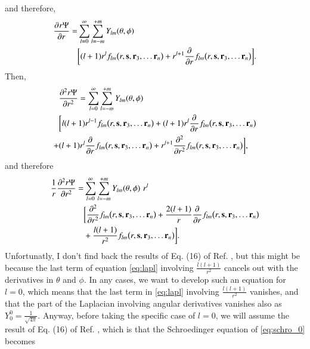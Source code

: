\documentclass[aip,jcp,reprint,noshowkeys,superscriptaddress]{revtex4-1}
\newcommand{\deriv}[3]{\frac{\partial^{#3} #1}{\partial {#2}^{#3}}}
\newcommand{\bd}[1]{{\bf {#1}}}
\newcommand{\bs}[0]{{\bf {s}}}
\begin{document}
and therefore, 
\begin{equation}
 \begin{aligned}
 \deriv{r\Psi}{r}{}  = & \sum_{l=0}^{\infty} \sum_{l=-m}^{+m}  Y_{lm}(\theta,\phi)\\  
  & \bigg[ (l+1) r^l f_{lm}\big(r,\bs,\bd{r}_3, \hdots \bd{r}_n\big) + r^{l+1} \deriv{}{r}{} f_{lm}\big(r,\bs,\bd{r}_3, \hdots \bd{r}_n\big)\bigg]. 
 \end{aligned}
\end{equation}
Then, 
\begin{equation}
 \begin{aligned}
 &\deriv{r\Psi}{r}{2}  = \sum_{l=0}^{\infty} \sum_{l=-m}^{+m}  Y_{lm}(\theta,\phi)\\   
 & \bigg[ l(l+1) r^{l-1} f_{lm}\big(r,\bs,\bd{r}_3, \hdots \bd{r}_n\big) + (l+1) r^l \deriv{}{r}{} f_{lm}\big(r,\bs,\bd{r}_3, \hdots \bd{r}_n\big) \\
+& (l+1) r^l  \deriv{}{r}{} f_{lm}\big(r,\bs,\bd{r}_3, \hdots \bd{r}_n\big) + r^{l+1} \deriv{}{r}{2} f_{lm}\big(r,\bs,\bd{r}_3, \hdots \bd{r}_n\big) \bigg],
 \end{aligned}
\end{equation}
and therefore 
\begin{equation}
 \label{eq:lapl}
 \begin{aligned}
 \frac{1}{r}\deriv{r\Psi}{r}{2}  =& \sum_{l=0}^{\infty} \sum_{l=-m}^{+m}  Y_{lm}(\theta,\phi) \, \, r^l\\
 & \bigg[  \deriv{}{r}{2} f_{lm}\big(r,\bs,\bd{r}_3, \hdots \bd{r}_n\big) 
 + \frac{2(l+1)}{r} \deriv{}{r}{} f_{lm}\big(r,\bs,\bd{r}_3, \hdots \bd{r}_n\big) \\
 & + \frac{l(l+1)}{r^2} f_{lm}\big(r,\bs,\bd{r}_3, \hdots \bd{r}_n\big) \bigg].
 \end{aligned}
\end{equation}
Unfortunatly, I don't find back the results of Eq. (16) of Ref. , but this might be because the last term of equation \eqref{eq:lapl} involving $\frac{l(l+1)}{r^2}$ cancels out with the derivatives in $\theta$ and $\phi$. 
In any cases, we want to develop such an equation for $l=0$, which means that the last term in \eqref{eq:lapl} involving $\frac{l(l+1)}{r^2}$ vanishes, and that the part of the Laplacian involving angular derivatives vanishes also as $Y_0^0 = \frac{1}{\sqrt{4\pi}}$. 
Anyway, before taking the specific case of $l=0$, we will assume the result of Eq. (16) of Ref. , which is  that the Schroedinger equation of \eqref{eq:schro_0} becomes
\end{document}
